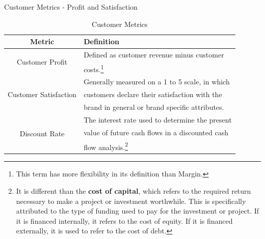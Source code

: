 \documentclass[pdf]{beamer}
\newcommand{\empr}[1]{{\color{franklinblue}\textbf{#1}}}
\theoremstyle{remark}
\theoremstyle{definition}
\begin{document}
\begin{frame}[t]{Customer Metrics - Profit and Satisfaction}
\footnotesize
\begin{table}[htbp]
  \centering
  \captionsetup{justification=centering}
    \begin{tabular}{|c|l|}
    \toprule
    Metric & Definition \\
    \midrule
    \multirow{2}{*}{Customer Profit} & Defined as customer revenue minus customer  \\
                    & costs.\footnote{This term has more flexibility in its definition than Margin.} \\
    \midrule 
    \multirow{3}{*}{Customer Satisfaction} & Generally measured on a 1 to 5 scale, in which \\
                          & customers declare their satisfaction with the  \\ 
                          & brand in general or brand specific attributes. \\
    \midrule 
    \multirow{3}{*}{Discount Rate} & %
    The interest rate used to determine the present \\ 
                  & value of future cash flows in a discounted cash  \\
                  & flow analysis.\footnote{It is different than the \empr{cost of capital}, which refers to the required return necessary to make a project or investment worthwhile. This is specifically attributed to the type of funding used to pay for the investment or project. If it is financed internally, it refers to the cost of equity. If it is financed externally, it is used to refer to the cost of debt.} \\
    \bottomrule
     \end{tabular}%
  \caption{Customer Metrics}
  \label{tab:custmetrics}%
\end{table}%
\end{frame}
\end{document}
